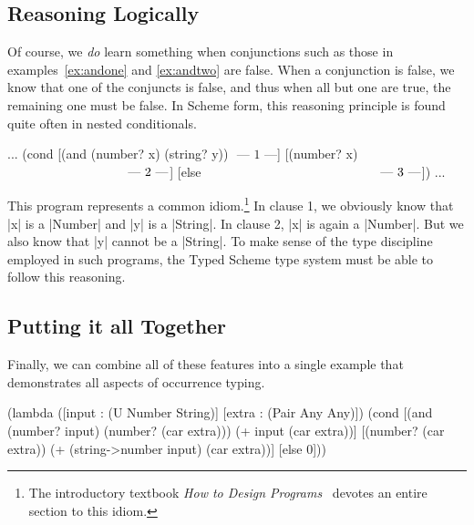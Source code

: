 \begin{schemeregion}
\subsection{Reasoning Logically}

Of course, we \emph{do} learn something
when conjunctions  such as those in examples~\ref{ex:andone} and
\ref{ex:andtwo} are false.  When a conjunction is false, we know
that one of the conjuncts is false, and thus when all but one are true,
the remaining one must be false.  In Scheme form, this reasoning
principle is found quite often in nested conditionals. 

\begin{exmp}
\begin{schemedisplay}
... (cond [(and (number? x) (string? y)) $\text{\ --- 1 ---}$]
          [(number? x) $\hspace{32.1mm}\text{\ --- 2 ---}$]
          [else $\hspace{47mm}\text{\ --- 3 ---}$]) ...
\end{schemedisplay}
\label{ex:logic}
\end{exmp}
\noindent
This program represents a common idiom.\footnote{The introductory
  textbook \textit{How to
    Design Programs}~\cite{fffk:htdp} devotes an entire
  section to this idiom.} 
In clause 1, we obviously know that \scheme|x| is a \scheme|Number|
and \scheme|y| is a \scheme|String|.  In clause 2, \scheme|x| is again
a \scheme|Number|.  But we also know that \scheme|y| cannot be a
\scheme|String|. 
To make sense of the type discipline employed in such
programs, the Typed Scheme type system must be able to follow this
reasoning.  

\subsection{Putting it all Together}

Finally, we can combine all of these features into a single example
that demonstrates all aspects of occurrence typing.  

\begin{exmp}
\begin{schemedisplay}
(lambda ([input : (U Number String)] [extra : (Pair Any Any)])
  (cond
    [(and (number? input) (number? (car extra)))
     (+ input (car extra))]
    [(number? (car extra))
     (+ (string->number input) (car extra))]
    [else 0]))
\end{schemedisplay}
  \label{ex:full}
\end{exmp}



\end{schemeregion}
